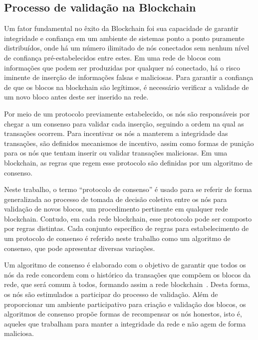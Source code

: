 \subsection{Processo de validação na Blockchain} \label{tex:fund:blockchain:consenso}

Um fator fundamental no êxito da Blockchain foi sua capacidade de garantir integridade e confiança em um ambiente de sistemas ponto a ponto puramente distribuídos, onde há um número ilimitado de nós conectados sem nenhum nível de confiança pré-estabelecidos entre estes. Em uma rede de blocos com informações que podem ser produzidas por qualquer nó conectado, há o risco iminente de inserção de informações falsas e maliciosas. Para garantir a confiança de que os blocos na blockchain são legítimos, é necessário verificar a validade de um novo bloco antes deste ser inserido na rede. 

Por meio de um protocolo previamente estabelecido, os nós são responsáveis por chegar a um consenso para validar cada inserção, seguindo a ordem na qual as transações ocorrem. Para incentivar os nós a manterem a integridade das transações, são definidos mecanismos de incentivo, assim como formas de punição para os nós que tentam inserir ou validar transações maliciosas. Em uma blockchain, as regras que regem esse protocolo são definidas por um algoritmo de consenso.

Neste trabalho, o termo ``protocolo de consenso'' é usado para se referir de forma generalizada ao processo de tomada de decisão coletiva entre os nós para validação de novos blocos, um procedimento pertinente em qualquer rede blockchain. Contudo, em cada rede blockchain, esse protocolo pode ser composto por regras distintas. Cada conjunto específico de regras para estabelecimento de um protocolo de consenso é referido neste trabalho como um algoritmo de consenso, que pode apresentar diversas variações.

Um algoritmo de consenso é elaborado com o objetivo de garantir que todos os nós da rede concordem com o histórico da transações que compõem os blocos da rede, que será comum à todos, formando assim a rede blockchain~\cite{consenso-xiao-2020}. Desta forma, os nós são estimulados a participar do processo de validação. Além de proporcionar um ambiente participativo para criação e validação dos blocos, os algoritmos de consenso propõe formas de recompensar os nós honestos, isto é, aqueles que trabalham para manter a integridade da rede e não agem de forma maliciosa. 

